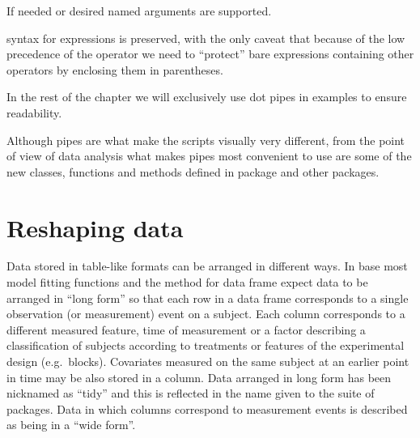 \documentclass[krantz2]{krantz}\usepackage{knitr}%
\begin{document}
If needed or desired named arguments are supported.
\begin{knitrout}\footnotesize
{}\color{fgcolor}
\end{knitrout}

\begin{warningbox}
\Rlang syntax for expressions is preserved, with the only caveat that because of the low precedence of the  operator we need to ``protect'' bare expressions containing other operators by enclosing them in parentheses.
\end{warningbox}

In the rest of the chapter we will exclusively use dot pipes in examples to ensure readability.

Although pipes are what make the scripts visually very different, from the point of view of data analysis what makes pipes most convenient to use are some of the new classes, functions and methods defined in package  and other  packages.

\section{Reshaping data}

Data stored in table-like formats can be arranged in different ways. In base \Rlang most model fitting functions and the  method for data frame expect data to be arranged in ``long form'' so that each row in a data frame corresponds to a single observation (or measurement) event on a subject. Each column corresponds to a different measured feature, time of measurement or a factor describing a classification of subjects according to treatments or features of the experimental design (e.g.\ blocks). Covariates measured on the same subject at an earlier point in time may be also stored in a column. Data arranged in long form has been nicknamed as ``tidy'' and this is reflected in the name given to the  suite of packages. Data in which columns correspond to measurement events is described as being in a ``wide form''.
\end{document}
